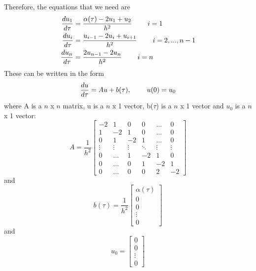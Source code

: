 \documentclass{article}
\begin{document}
\noindent
Therefore, the equations that we need are
\begin{equation}
\begin{split}
    \frac{d u_1}{d\tau} &= \frac{\alpha(\tau) - 2u_1 + u_{2}}{h^2}  \hspace{0.8cm} i = 1 \\
    \frac{d u_i}{d\tau} &= \frac{u_{i-1} - 2u_i + u_{i+1}}{h^2}  \hspace{0.8cm} i = 2, ..., n-1    \\
    \frac{d u_n}{d\tau} &= \frac{2u_{n-1} - 2u_n}{h^2}  \hspace{0.8cm} i = n
\end{split}
\end{equation}
These can be written in the form
\begin{equation}
    \frac{d u}{d \tau} = Au + b(\tau), \hspace{0.8cm} u(0) = u_0
\end{equation}
where A is a $n$ x $n$ matrix, u is a $n$ x 1 vector, b($\tau$) is a $n$ x 1 vector and $u_0$ is a $n$ x 1 vector:
\begin{equation}
    A = \frac{1}{h^2} 
\begin{bmatrix}
    -2     &  1     &  0     &  0     & \dots  &  0     \\
    1      & -2     &  1     &  0     & \dots  &  0     \\
    0      &  1     & -2     &  1     & \dots  &  0     \\
    \vdots & \vdots & \vdots & \ddots & \vdots & \vdots \\
    0      & \dots  &  1     & -2     &  1     &  0     \\
    0      & \dots  &  0     &  1     & -2     &  1     \\
    0      & \dots  &  0     &  0     &  2     & -2
\end{bmatrix}
\end{equation}
and
\begin{equation}
  b(\tau) = \frac{1}{h^2} 
  \begin{bmatrix}
    \alpha(\tau) \\
    0                        \\
    0                        \\
    \vdots                   \\
    0
  \end{bmatrix}
\end{equation}
and
\begin{equation}
  u_0 =
  \begin{bmatrix}
    0      \\
    0      \\
    \vdots \\
    0
  \end{bmatrix}
\end{equation}
\end{document}
